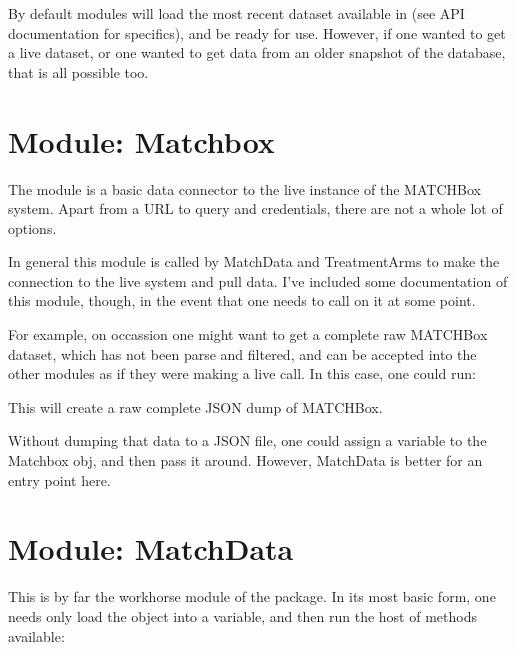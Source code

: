 \documentclass[letterpaper,10pt,english]{sphinxmanual}
\begin{document}
By default modules will load the most recent dataset available in
 (see API documentation for specifics), and be ready for use.
However, if one wanted to get a live dataset, or one wanted to get data from an
older snapshot of the database, that is all possible too.


\section{Module: Matchbox}
\label{\detokenize{tutorial:module-matchbox}}
The  module is a basic data connector to the live instance of the
MATCHBox system.  Apart from a URL to query and credentials, there are not a
whole lot of options.

In general this module is called by MatchData and TreatmentArms to make the
connection to the live system and pull data.  I’ve included some documentation of
this module, though, in the event that one needs to call on it at some point.

For example, on occassion one might want to get a complete raw MATCHBox dataset,
which has not been parse and filtered, and can be accepted into the other modules
as if they were making a live call.  In this case, one could run:

%
\begin{sphinxVerbatim}[commandchars=\\\{\}]
   
\end{sphinxVerbatim}

This will create a raw complete JSON dump of MATCHBox.

Without dumping that data to a JSON file, one could assign a variable to the
Matchbox obj, and then pass it around.  However, MatchData is better for an
entry point here.


\section{Module: MatchData}
\label{\detokenize{tutorial:module-matchdata}}
This is by far the workhorse module of the package.  In its most basic form, one
needs only load the object into a variable, and then run the host of methods
available:
\end{document}
